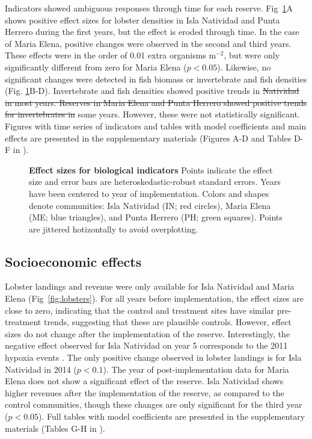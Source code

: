 \documentclass[10pt,letterpaper]{article}
\providecommand{\DIFaddtex}[1]{{\protect\color{blue}\uwave{#1}}} %
\providecommand{\DIFdeltex}[1]{{\protect\color{red}\sout{#1}}}                      %
\providecommand{\DIFaddbegin}{} %
\providecommand{\DIFaddend}{} %
\providecommand{\DIFdelbegin}{} %
\providecommand{\DIFdelend}{} %
\providecommand{\DIFadd}[1]{\texorpdfstring{\DIFaddtex{#1}}{#1}} %
\providecommand{\DIFdel}[1]{\texorpdfstring{\DIFdeltex{#1}}{}} %
\newcommand{\DIFscaledelfig}{0.5}
\newlength{\DIFdelgraphicswidth} %
\newlength{\DIFdelgraphicsheight} %
\newcommand{\DIFaddincludegraphics}[2][]{{\color{blue}\fbox{\DIFOincludegraphics[#1]{#2}}}} %
\newcommand{\DIFdelincludegraphics}[2][]{%
\sbox{\DIFdelgraphicsbox}{\DIFOincludegraphics[#1]{#2}}%
\settoboxwidth{\DIFdelgraphicswidth}{\DIFdelgraphicsbox} %
\settoboxtotalheight{\DIFdelgraphicsheight}{\DIFdelgraphicsbox} %
\scalebox{\DIFscaledelfig}{%
\parbox[b]{\DIFdelgraphicswidth}{\usebox{\DIFdelgraphicsbox}\\[-\baselineskip] \rule{\DIFdelgraphicswidth}{0em}}\llap{\resizebox{\DIFdelgraphicswidth}{\DIFdelgraphicsheight}{%
\setlength{\unitlength}{\DIFdelgraphicswidth}%
\begin{picture}(1,1)%
\thicklines\linethickness{2pt} %
{\color[rgb]{1,0,0}\put(0,0){\framebox(1,1){}}}%
{\color[rgb]{1,0,0}\put(0,0){\line( 1,1){1}}}%
{\color[rgb]{1,0,0}\put(0,1){\line(1,-1){1}}}%
\end{picture}%
}\hspace*{3pt}}} %
} %
\DeclareRobustCommand{\DIFaddbegin}{\DIFOaddbegin \let\includegraphics\DIFaddincludegraphics} %
\DeclareRobustCommand{\DIFaddend}{\DIFOaddend \let\includegraphics\DIFOincludegraphics} %
\DeclareRobustCommand{\DIFdelbegin}{\DIFOdelbegin \let\includegraphics\DIFdelincludegraphics} %
\DeclareRobustCommand{\DIFdelend}{\DIFOaddend \let\includegraphics\DIFOincludegraphics} %
\begin{document}
Indicators showed ambiguous responses through time for each reserve. Fig~\ref{fig:indicators}A shows positive effect sizes for lobster densities in Isla Natividad and Punta Herrero during the first years, but the effect is eroded through time. In the case of Maria Elena, positive changes were observed in the second and third years. These effects were in the order of 0.01 extra organisms $\mathrm{m}^{-2}$, but were only significantly different from zero for Maria Elena ($p < 0.05$). Likewise, no significant changes were detected in fish biomass or invertebrate and fish densities (Fig. \ref{fig:indicators}B-D). Invertebrate and fish densities showed positive trends in \DIFdelbegin \DIFdel{Natividad in most years. Reserves in Maria Elena and Punta Herrero showed positive trends for invertebrates in }\DIFdelend \DIFaddbegin \DIFadd{all reserves for }\DIFaddend some years. However, these were not statistically significant. Figures with time series of indicators and tables with model coefficients and main effects are presented in the supplementary materials (Figures A-D and Tables D-F in ).

\begin{figure}[h]
\centering
\caption{{\bf Effect sizes for biological indicators}
Points indicate the effect size and error bars are heteroskedastic-robust standard errors. Years have been centered to year of implementation. Colors and shapes denote communities: Isla Natividad (IN; red circles), Maria Elena (ME; blue triangles), and Punta Herrero (PH; green squares). Points are jittered hotizontally to avoid overplotting.}
\label{fig:indicators}
\end{figure}

\subsection*{Socioeconomic effects}

Lobster landings and revenue were only available for Isla Natividad and Maria Elena (Fig~\ref{fig:lobsters}). For all years before implementation, the effect sizes are close to zero, indicating that the control and treatment sites have similar pre-treatment trends, suggesting that these are plausible controls. However, effect sizes do not change after the implementation of the reserve. Interestingly, the negative effect observed for Isla Natividad on year 5 corresponds to the 2011 hypoxia events \cite{micheli_2012-EU}. The only positive change observed in lobster landings is for Isla Natividad in 2014 ($p < 0.1$). The year of post-implementation data for Maria Elena does not show a significant effect of the reserve. Isla Natividad shows higher revenues after the implementation of the reserve, as compared to the control communities, though these changes are only significant for the third year ($p < 0.05$). Full tables with model coefficients are presented in the supplementary materials (Tables G-H in ).
\end{document}
